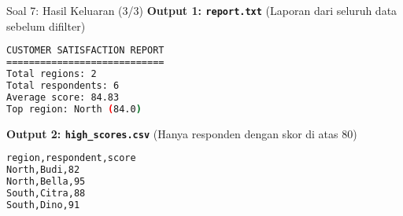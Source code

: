 \documentclass[aspectratio=169, table]{beamer}
\begin{document}
\begin{frame}[fragile]{Soal 7: Hasil Keluaran (3/3)}
\vspace{10pt}
\textbf{Output 1: \texttt{report.txt}}  
(Laporan dari seluruh data sebelum difilter)
\begin{lstlisting}[language=bash,basicstyle=\ttfamily\small]
CUSTOMER SATISFACTION REPORT
============================
Total regions: 2
Total respondents: 6
Average score: 84.83
Top region: North (84.0)
\end{lstlisting}

\textbf{Output 2: \texttt{high\_scores.csv}}  
(Hanya responden dengan skor di atas 80)
\begin{lstlisting}[language=bash,basicstyle=\ttfamily\small]
region,respondent,score
North,Budi,82
North,Bella,95
South,Citra,88
South,Dino,91
\end{lstlisting}
\end{frame}
\end{document}
